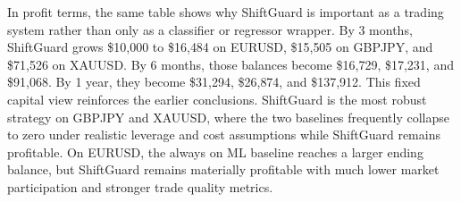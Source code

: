 \documentclass[11pt]{article}
\begin{document}
\begin{table}[H]
\centering
\caption{Ending balance from a \$10{,}000 starting investment per pair. Assumptions: 1:20 leverage fixed trading cost approximation 30\% tax on profits and a 1\% stop loss cap in the simulator.}
\label{tab:investment_balances}
\end{table}

In profit terms, the same table shows why ShiftGuard is important as a trading system rather than only as a classifier or regressor wrapper. By 3 months, ShiftGuard grows \$10{,}000 to \$16{,}484 on EURUSD, \$15{,}505 on GBPJPY, and \$71{,}526 on XAUUSD. By 6 months, those balances become \$16{,}729, \$17{,}231, and \$91{,}068. By 1 year, they become \$31{,}294, \$26{,}874, and \$137{,}912. This fixed capital view reinforces the earlier conclusions. ShiftGuard is the most robust strategy on GBPJPY and XAUUSD, where the two baselines frequently collapse to zero under realistic leverage and cost assumptions while ShiftGuard remains profitable. On EURUSD, the always on ML baseline reaches a larger ending balance, but ShiftGuard remains materially profitable with much lower market participation and stronger trade quality metrics.
\end{document}
